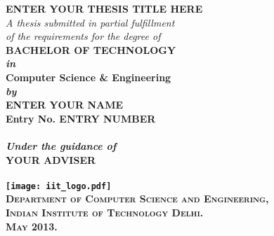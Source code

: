 \begin{titlepage}
\begin{center}

\LARGE{\textsf{\bfseries ENTER YOUR THESIS TITLE HERE}}\\
\vspace{20pt}
\normalsize
\emph{A thesis submitted in partial fulfillment} \\
\emph{of the requirements for the degree of} \\
\vspace{20pt}
\bfseries BACHELOR OF TECHNOLOGY \\
\vspace{20pt}
\emph {in}\\
\vspace{20pt}
\bfseries Computer Science \& Engineering \\
\vspace{20pt}
\emph {by}\\
\vspace{20pt}
\Large{\textsf{\bfseries ENTER YOUR NAME}} \\
{\normalsize \textsf{\bfseries Entry No. ENTRY NUMBER}}\\
\ \\
{\normalsize \emph {Under the guidance of}}
\ \\
\Large{\textsf{\bfseries YOUR ADVISER}} \\
\ \\
\vspace{30pt}
\texttt{[image: iit\_logo.pdf]} \\
\vspace{10pt}
\large{\textsc{Department of Computer Science and Engineering,\\
Indian Institute of Technology Delhi.\\ May 2013.}}
\end{center}
\end{titlepage}
